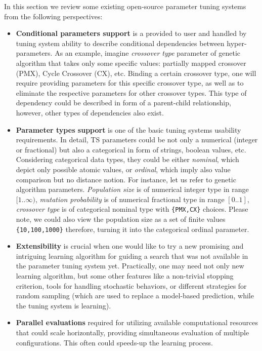 In this section we review some existing open-source parameter tuning systems from the following perspectives:
\begin{itemize}
	\item \textbf{Conditional parameters support} is a provided to user and handled by tuning system ability to describe conditional dependencies between hyper-parameters. As an example, imagine \emph{crossover type} parameter of genetic algorithm that takes only some specific values: partially mapped crossover (PMX), Cycle Crossover (CX), etc. Binding a certain crossover type, one will require providing parameters for this specific crossover type, as well as to eliminate the respective parameters for other crossover types. This type of dependency could be described in form of a parent-child relationship, however, other types of dependencies also exist.
	
	\item \textbf{Parameter types support} is one of the basic tuning systems usability requirements. In detail, TS parameters could be not only a numerical (integer or fractional) but also a categorical in form of strings, boolean values, etc. Considering categorical data types, they could be either \emph{nominal}, which depict only possible atomic values, or \emph{ordinal}, which imply also value comparison but no distance notion. For instance, let us refer to genetic algorithm parameters. \emph{Population size} is of numerical integer type in range $[1..\infty)$, \emph{mutation probability} is of numerical fractional type in range $[0..1]$, \emph{crossover type} is of categorical nominal type with \texttt{\{PMX,CX\}} choices. Please note, we could also view the population size as a set of finite values \texttt{\{10,100,1000\}} therefore, turning it into the categorical ordinal parameter.
	
	\item \textbf{Extensibility} is crucial when one would like to try a new promising and intriguing learning algorithm for guiding a search that was not available in the parameter tuning system yet. Practically, one may need not only new learning algorithm, but some other features like a non-trivial stopping criterion, tools for handling stochastic behaviors, or different strategies for random sampling (which are used to replace a model-based prediction, while the tuning system is learning).
	
	\item \textbf{Parallel evaluations} required for utilizing available computational resources that could scale horizontally, providing simultaneous evaluation of multiple configurations. This often could speeds-up the learning process.
\end{itemize}

